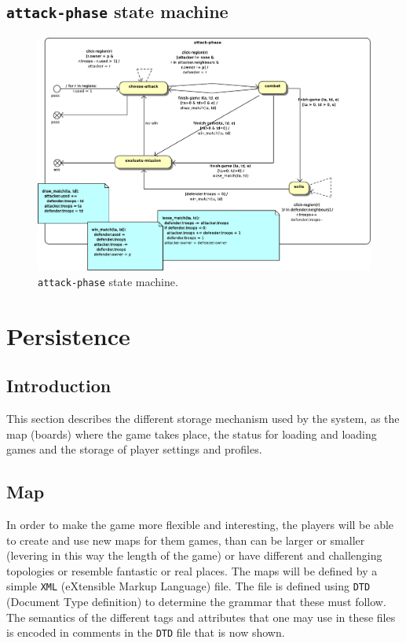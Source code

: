 \documentclass[12pt,a4paper]{article}
\let\stdsection\section
\renewcommand\section{\newpage\stdsection}
\begin{document}
\subsection{\texttt{attack-phase} state machine}
\begin{figure}[H]
  \centering
  \includegraphics[width=15cm]{pic/7.pdf}
  \caption{\texttt{attack-phase} state machine.}
  \label{fig:sm:global}
\end{figure}


\section{Persistence}

\subsection{Introduction}
This section describes the different storage mechanism used by the
system, as the map (boards) where the game takes place, the status for
loading and loading games and the storage of player settings and profiles.

\subsection{Map}

In order to make the game more flexible and interesting, the players
will be able to create and use new maps for them games, than can be
larger or smaller (levering in this way the length of the game) or
have different and challenging topologies or resemble fantastic or
real places. The maps will be defined by a simple \texttt{XML}
(eXtensible Markup Language) file. The file is defined using
\texttt{DTD} (Document Type definition) to determine the grammar that
these must follow. The semantics of the different tags and attributes
that one may use in these files is encoded in comments in the
\texttt{DTD} file that is now shown.
\end{document}
